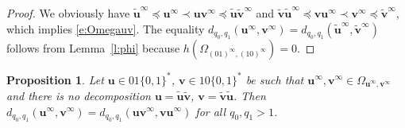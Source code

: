 \documentclass{amsart}
\newtheorem{proposition}[theorem]{Proposition}
\theoremstyle{definition}
\numberwithin{equation}{section}
\newcommand{\bu}{\mathbf{u}}
\newcommand{\bv}{\mathbf{v}}
\begin{document}
\begin{proof}
We obviously have $\tilde{\bu}^\infty \preceq \bu^\infty \prec \bu\bv^\infty \preceq \tilde{\bu} \tilde{\bv}^\infty$ and $\tilde{\bv}\tilde{\bu}^\infty \preceq \bv\bu^\infty \prec \bv^\infty \preceq \tilde{\bv}^\infty$, which implies \eqref{e:Omegauv}.
The equality $d_{q_0,q_1}(\bu^\infty,\bv^\infty) = d_{q_0,q_1}(\tilde{\bu}^\infty,\tilde{\bv}^\infty)$ follows from Lemma~\ref{l:phi} because $h(\Omega_{(01)^\infty,(10)^\infty}) = 0$.
\end{proof}

\begin{proposition} \label{p:uv}
Let $\bu \in 01\{0,1\}^*$, $\bv \in 10\{0,1\}^*$ be such that $\bu^\infty, \bv^\infty \in \Omega_{\bu^\infty,\bv^\infty}$ and there is no decomposition $\bu = \tilde{\bu}\tilde{\bv}$, $\bv = \tilde{\bv}\tilde{\bu}$.
Then $d_{q_0,q_1}(\bu^\infty,\bv^\infty) = d_{q_0,q_1}(\bu\bv^\infty,\bv\bu^\infty)$ for all $q_0,q_1 > 1$.
\end{proposition}
\end{document}
